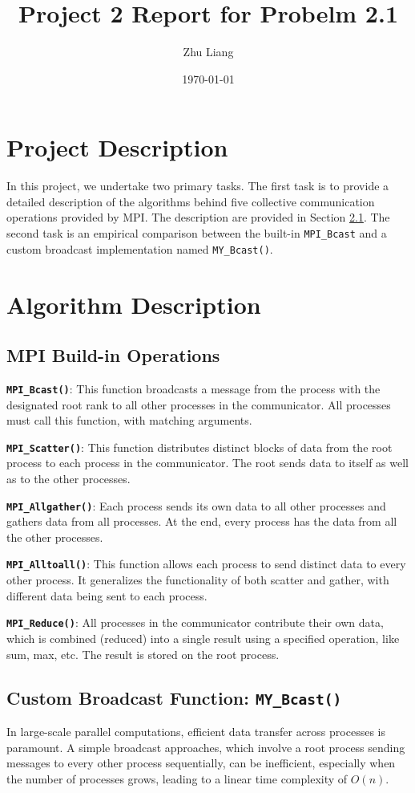 \documentclass[12pt,a4paper]{article}
\title{Project 2 Report for Probelm 2.1}
\author{Zhu Liang}
\date{\today}
\begin{document}
\maketitle

\section{Project Description}
In this project, we undertake two primary tasks. 
The first task is to provide a detailed description of the algorithms behind five collective communication operations provided by MPI.
The description are provided in Section \ref{sec:mpi_buildin}.
The second task is an empirical comparison between the built-in \texttt{MPI\_Bcast} and a custom broadcast implementation named \texttt{MY\_Bcast()}.


\section{Algorithm Description}
\subsection{MPI Build-in Operations}
\label{sec:mpi_buildin}


\textbf{\texttt{MPI\_Bcast()}}: This function broadcasts a message from the process with the designated root rank to all other processes in the communicator. All processes must call this function, with matching arguments.

\textbf{\texttt{MPI\_Scatter()}}: This function distributes distinct blocks of data from the root process to each process in the communicator. The root sends data to itself as well as to the other processes.

\textbf{\texttt{MPI\_Allgather()}}: Each process sends its own data to all other processes and gathers data from all processes. At the end, every process has the data from all the other processes.

\textbf{\texttt{MPI\_Alltoall()}}: This function allows each process to send distinct data to every other process. It generalizes the functionality of both scatter and gather, with different data being sent to each process.

\textbf{\texttt{MPI\_Reduce()}}: All processes in the communicator contribute their own data, which is combined (reduced) into a single result using a specified operation, like sum, max, etc. The result is stored on the root process.


\subsection{Custom Broadcast Function: \texttt{MY\_Bcast()}}
In large-scale parallel computations, efficient data transfer across processes is paramount. 
A simple broadcast approaches, 
which involve a root process sending messages to every other process sequentially, 
can be inefficient, 
especially when the number of processes grows, 
leading to a linear time complexity of $O(n)$.
\end{document}
